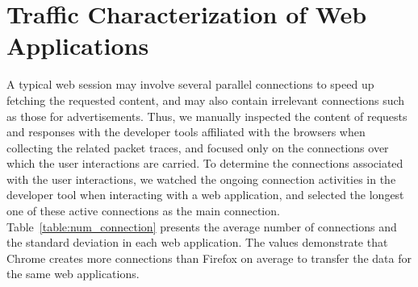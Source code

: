 \section{Traffic Characterization of Web Applications}
\label{sec:characterization}
A typical web session may involve several parallel connections to speed up fetching the requested content, and may also contain irrelevant connections such as those for advertisements. Thus, we manually inspected the content of requests and responses with the developer tools affiliated with the browsers when collecting the related packet traces, and focused only on the connections over which the user interactions are carried. To determine the connections associated with the user interactions, we watched the ongoing connection activities in the developer tool when interacting with a web application, and selected the longest one of these active connections as the main connection. Table~\ref{table:num_connection} presents the average number of connections and the standard deviation in each web application. The values demonstrate that Chrome creates more connections than Firefox on average to transfer the data for the same web applications. 

